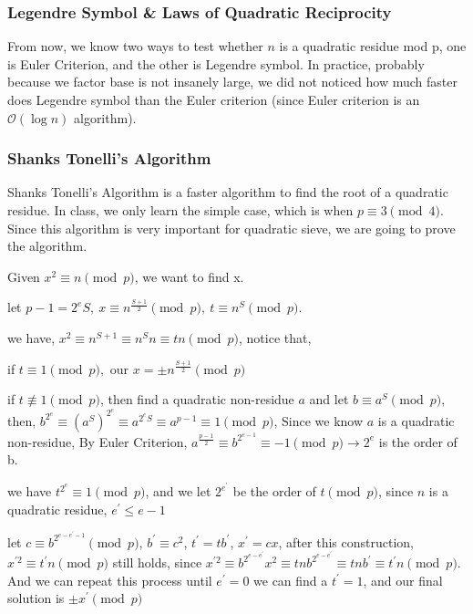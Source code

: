 \documentclass[12pt]{article} %
\begin{document}
\subsubsection{Legendre Symbol \& Laws of Quadratic Reciprocity}

From now, we know two ways to test whether $n$ is a quadratic residue mod p, one is Euler Criterion, and the other is Legendre symbol. In practice, probably because we factor base is not insanely large, we did not noticed how much faster does Legendre symbol than the Euler criterion (since Euler criterion is an $\mathcal{O}(\log{n}) $ algorithm).

\subsubsection{Shanks Tonelli's Algorithm}

Shanks Tonelli's Algorithm is a faster algorithm to find the root of a quadratic residue. In class, we only learn the simple case, which is when $p \equiv 3 \pmod{4}$. Since this algorithm is very important for quadratic sieve, we are going to prove the algorithm.

Given $x^2 \equiv n \pmod{p} $, we want to find x.

let $p-1 = 2^eS,\ x \equiv n^{\frac{S+1}{2}} \pmod{p},\ t \equiv n^S \pmod{p}.$

we have, $x^2 \equiv n^{S+1} \equiv n^Sn \equiv tn \pmod{p}$, notice that, 

if $t \equiv 1 \pmod{p},$ our $x = \pm n^{\frac{S+1}{2}} \pmod{p}$

if $t \not\equiv 1 \pmod{p}$, then find a quadratic non-residue $a$ and let $b \equiv a^S \pmod{p}$, then, $b^{2^e} \equiv (a^S)^{2^e} \equiv a^{2^eS} \equiv a^{p-1} \equiv 1 \pmod{p}$, Since we know $a$ is a quadratic non-residue, By Euler Criterion, $a^{\frac{p-1}{2}} \equiv b^{2^{e-1}} \equiv -1 \pmod{p} \rightarrow 2^e$ is the order of b.

we have $t^{2^e} \equiv 1 \pmod{p}$, and we let $2^{e^\prime}$ be the order of $t \pmod{p}$, since $n$ is a quadratic residue, $e^\prime \le e-1$

let $c \equiv b^{2^{e-e^\prime-1}} \pmod{p}$, $b^\prime \equiv c^2$, $t^\prime = tb^\prime$, $x^\prime = cx$, after this construction, $x^{\prime 2} \equiv t^\prime n \pmod{p}$ still holds, since $x^{\prime 2} \equiv b^{2^{e-e^\prime}}x^2 \equiv tnb^{2^{e-e^\prime}} \equiv tnb^\prime \equiv  t^\prime n \pmod{p}$. And we can repeat this process until $e^\prime = 0$ we can find a $t^\prime = 1$, and our final solution is $ \pm x^\prime \pmod{p}$
\end{document}
